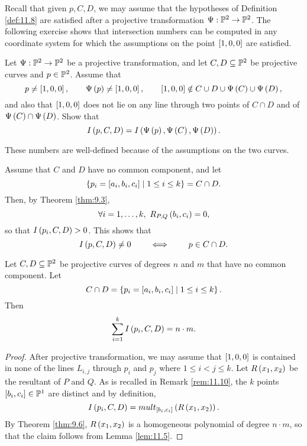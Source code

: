Recall that given $ p, C, D $, we may assume that the hypotheses of Definition \ref{def:11.8} are satisfied after a projective transformation $ \Psi : \P^2 \to \P^2 $. The following exercise shows that intersection numbers can be computed in any coordinate system for which the assumptions on the point $ \sb{1, 0, 0} $ are satisfied.

\begin{exercise}
Let $ \Psi : \P^2 \to \P^2 $ be a projective transformation, and let $ C, D \subseteq \P^2 $ be projective curves and $ p \in \P^2 $. Assume that
$$ p \ne \sb{1, 0, 0}, \qquad \Psi\rb{p} \ne \sb{1, 0, 0}, \qquad \sb{1, 0, 0} \notin C \cup D \cup \Psi\rb{C} \cup \Psi\rb{D}, $$
and also that $ \sb{1, 0, 0} $ does not lie on any line through two points of $ C \cap D $ and of $ \Psi\rb{C} \cap \Psi\rb{D} $. Show that
$$ I\rb{p, C, D} = I\rb{\Psi\rb{p}, \Psi\rb{C}, \Psi\rb{D}}. $$
\end{exercise}

\begin{note*}
These numbers are well-defined because of the assumptions on the two curves.
\end{note*}

\begin{remark}
\label{rem:11.10}
Assume that $ C $ and $ D $ have no common component, and let
$$ \cb{p_i = \sb{a_i, b_i, c_i} \mid 1 \le i \le k} = C \cap D. $$
Then, by Theorem \ref{thm:9.3},
$$ \forall i = 1, \dots, k, \ R_{P, Q}\rb{b_i, c_i} = 0, $$
so that $ I\rb{p_i, C, D} > 0 $. This shows that
$$ I\rb{p, C, D} \ne 0 \qquad \iff \qquad p \in C \cap D. $$
\end{remark}

\pagebreak

\begin{theorem}
\label{thm:11.11}
Let $ C, D \subseteq \P^2 $ be projective curves of degrees $ n $ and $ m $ that have no common component. Let
$$ C \cap D = \cb{p_i = \sb{a_i, b_i, c_i} \mid 1 \le i \le k}. $$
Then
$$ \sum_{i = 1}^k I\rb{p_i, C, D} = n \cdot m. $$
\end{theorem}

\begin{proof}
After projective transformation, we may assume that $ \sb{1, 0, 0} $ is contained in none of the lines $ L_{i, j} $ through $ p_i $ and $ p_j $ where $ 1 \le i < j \le k $. Let $ R\rb{x_1, x_2} $ be the resultant of $ P $ and $ Q $. As is recalled in Remark \ref{rem:11.10}, the $ k $ points $ \sb{b_i, c_i} \in \P^1 $ are distinct and by definition,
$$ I\rb{p_i, C, D} = mult_{\sb{b_i, c_i}}\rb{R\rb{x_1, x_2}}. $$
By Theorem \ref{thm:9.6}, $ R\rb{x_1, x_2} $ is a homogeneous polynomial of degree $ n \cdot m $, so that the claim follows from Lemma \ref{lem:11.5}.
\end{proof}

